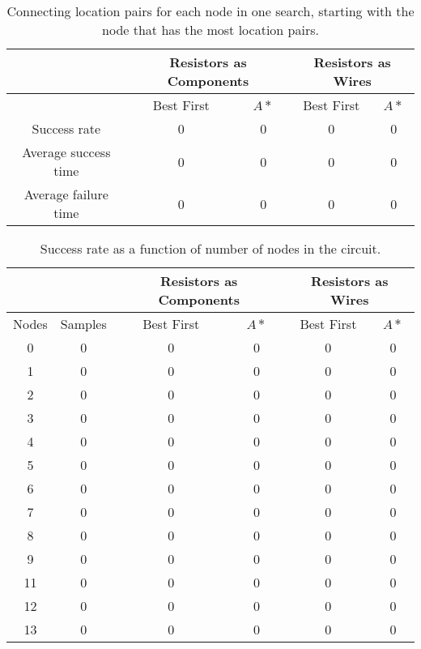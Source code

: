 \begin{table}[H]
\begin{center}
\begin{singlespace}
\begin{tabular}{| c || c | c | c | c |}
\hline
 & \multicolumn{2}{|c|}{Resistors as Components} & \multicolumn{2}{|c|}{
 Resistors as Wires} \\
\hline
 & Best First & $A*$ & Best First & $A*$ \\
\hline\hline
Success rate & 0 & 0 & 0 & 0 \\
Average success time & 0 & 0 & 0 & 0 \\
Average failure time & 0 & 0 & 0 & 0 \\
\hline
\end{tabular}
\end{singlespace}
\end{center}
\caption{Connecting location pairs for each node in one search, starting with
the node that has the most location pairs.}
\end{table}

\begin{table}[H]
\begin{center}
\begin{singlespace}
\begin{tabular}{| c | c || c | c | c | c |}
\hline
 & & \multicolumn{2}{|c|}{Resistors as Components} & \multicolumn{2}{|c|}{
 Resistors as Wires} \\
\hline
Nodes & Samples & Best First & $A*$ & Best First & $A*$ \\
\hline\hline
0 & 0 & 0 & 0 & 0 & 0 \\
1 & 0 & 0 & 0 & 0 & 0 \\
2 & 0 & 0 & 0 & 0 & 0 \\
3 & 0 & 0 & 0 & 0 & 0 \\
4 & 0 & 0 & 0 & 0 & 0 \\
5 & 0 & 0 & 0 & 0 & 0 \\
6 & 0 & 0 & 0 & 0 & 0 \\
7 & 0 & 0 & 0 & 0 & 0 \\
8 & 0 & 0 & 0 & 0 & 0 \\
9 & 0 & 0 & 0 & 0 & 0 \\
11 & 0 & 0 & 0 & 0 & 0 \\
12 & 0 & 0 & 0 & 0 & 0 \\
13 & 0 & 0 & 0 & 0 & 0 \\
\hline
\end{tabular}
\end{singlespace}
\end{center}
\caption{Success rate as a function of number of nodes in the circuit.}
\end{table}

